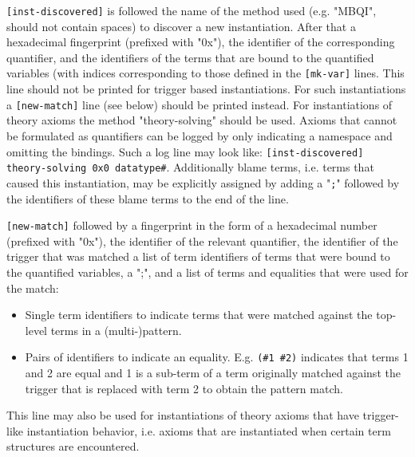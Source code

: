 \documentclass[orivec]{llncs}
\begin{document}
\texttt{[inst-discovered]} is followed the name of the method used (e.g. "MBQI", should not contain spaces) to discover a new instantiation. After that a hexadecimal fingerprint (prefixed with "0x"), the identifier of the corresponding quantifier, and the identifiers of the terms that are bound to the quantified variables (with indices corresponding to those defined in the \texttt{[mk-var]} lines. This line should not be printed for trigger based instantiations. For such instantiations a \texttt{[new-match]} line (see below) should be printed instead. For instantiations of theory axioms the method "theory-solving" should be used. Axioms that cannot be formulated as quantifiers can be logged by only indicating a namespace and omitting the bindings. Such a log line may look like: \texttt{[inst-discovered] theory-solving 0x0 datatype\#}. Additionally blame terms, i.e. terms that caused this instantiation, may be explicitly assigned by adding a "\texttt{;}" followed by the identifiers of these blame terms to the end of the line.

\texttt{[new-match]} followed by a fingerprint in the form of a hexadecimal number (prefixed with "0x"), the identifier of the relevant quantifier, the identifier of the trigger that was matched a list of term identifiers of terms that were bound to the quantified variables, a ";", and a list of terms and equalities that were used for the match:
\begin{itemize}
\item Single term identifiers to indicate terms that were matched against the top-level terms in a (multi-)pattern.
\item Pairs of identifiers to indicate an equality. E.g. \texttt{(\#1 \#2)} indicates that terms 1 and 2 are equal and 1 is a sub-term of a term originally matched against the trigger that is replaced with term 2 to obtain the pattern match.
\end{itemize}
This line may also be used for instantiations of theory axioms that have trigger-like instantiation behavior, i.e. axioms that are instantiated when certain term structures are encountered.
\end{document}
